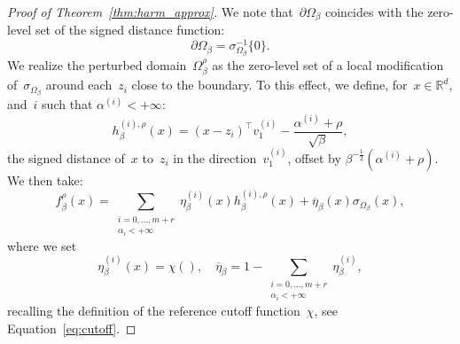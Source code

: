 \documentclass[10pt]{article}
\newcommand{\R}{\mathbb{R}}
\newcommand{\1}{\mathbbm 1}
\newcommand{\epsLimit}[1]{\alpha^{(#1)}} %
\newcommand{\hessEigvec}[2]{v^{(#1)}_{#2}} %
\newcommand{\shift}{\rho} %
\begin{document}
\begin{proof}[Proof of Theorem~\ref{thm:harm_approx}]
        We note that~$\partial\Omega_\beta$ coincides with the zero-level set of the signed distance function:
        \[\partial\Omega_\beta = \sigma_{\Omega_\beta}^{-1}\{0\}.\]
        We realize the perturbed domain~$\Omega_\beta^\shift$ as the zero-level set of a local modification of~$\sigma_{\Omega_\beta}$ around each~$z_i$ close to the boundary.
        To this effect, we define, for~$x\in\R^d$, and~$i$ such that $\epsLimit{i}<+\infty$:
        $$h_{\beta}^{(i),\shift}(x) = (x-z_i)^\intercal \hessEigvec{i}{1} - \frac{\epsLimit{i} + \shift}{\sqrt\beta},$$
        the signed distance of~$x$ to~$z_i$ in the direction~$\hessEigvec{i}{1}$, offset by $\beta^{-\frac12}(\epsLimit{i}+\shift)$.
        We then take:
        \begin{equation}
            \label{eq:perturbed_distance_function}
            f^\shift_\beta(x) = \sum_{\substack{i=0,\dots,m+r\\\alpha_i<+\infty}} \eta_\beta^{(i)}(x)h_{\beta}^{(i),\shift}(x) + \overline\eta_\beta(x)\sigma_{\Omega_\beta}(x),
        \end{equation}
        where we set
        \[\eta_\beta^{(i)}(x) = \chi\left(\right),\quad \overline\eta_\beta = 1 - \sum_{\substack{i=0,\dots,m+r\\\alpha_i<+\infty}} \eta_\beta^{(i)},\]
        recalling the definition of the reference cutoff function~$\chi$, see Equation~\eqref{eq:cutoff}.


\end{proof}
\end{document}
